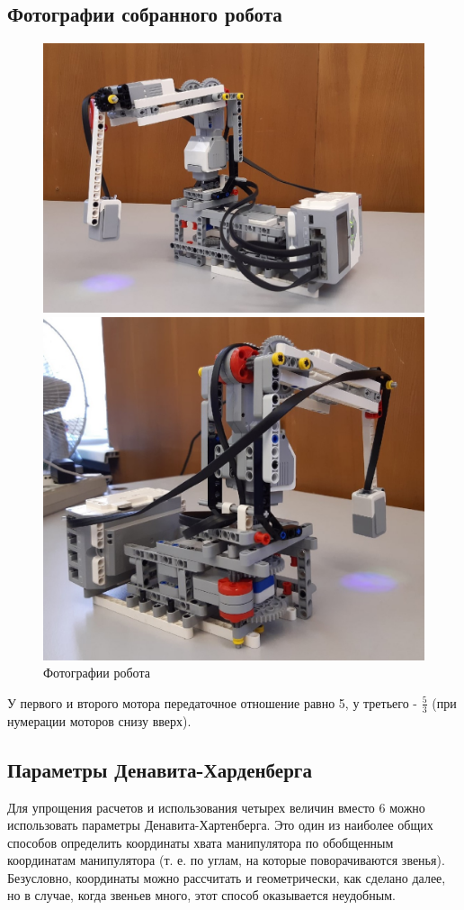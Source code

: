 \documentclass{article}
\begin{document}
\subsection*{Фотографии собранного робота}
\begin{figure}[h!]
    \begin{minipage}{.55\textwidth}
        \centering
        \includegraphics[width=250 pt]{robot_photo1.jpg}
    \end{minipage}
    \begin{minipage}{.55\textwidth}
        \centering
        \includegraphics[width=198 pt]{robot_photo2.jpg}
    \end{minipage}
    \caption{Фотографии робота}
\end{figure}
\FloatBarrier
\par У первого и второго мотора передаточное отношение равно 5, у третьего - $\frac{5}{3}$ (при нумерации моторов снизу вверх).
\subsection*{Параметры Денавита-Харденберга}
\par Для упрощения расчетов и использования четырех величин вместо 6 можно использовать параметры Денавита-Хартенберга. Это один из наиболее общих способов определить координаты хвата манипулятора по обобщенным координатам манипулятора (т. е. по углам, на которые поворачиваются звенья). Безусловно, координаты можно рассчитать и геометрически, как сделано далее, но в случае, когда звеньев много, этот способ оказывается неудобным. \\
\end{document}
